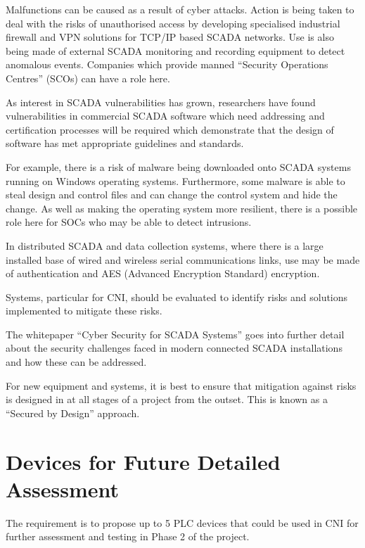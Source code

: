 Malfunctions can be caused as a result of cyber attacks. Action is being taken to deal with the risks of unauthorised access by developing specialised industrial firewall and VPN solutions for TCP/IP based SCADA networks. Use is also being made of external SCADA monitoring and recording equipment to detect anomalous events. Companies which provide manned ``Security Operations Centres''  (SCOs) can have a role here.

As interest in SCADA vulnerabilities has grown, researchers have found vulnerabilities in commercial SCADA software which need addressing and certification processes will be required which demonstrate that the design of software has met appropriate guidelines and standards.

For example, there is a risk of malware being downloaded onto SCADA systems running on Windows operating systems. Furthermore, some malware is able to steal design and control files and can change the control system and hide the change. As well as making the operating system more resilient, there is a possible role here for SOCs who may be able to detect intrusions.

In distributed SCADA and data collection systems, where there is a large installed base of wired and wireless serial communications links, use may be made of authentication and AES (Advanced Encryption Standard) encryption.

Systems, particular for CNI, should be evaluated to identify risks and solutions implemented to mitigate these risks.

The whitepaper ``Cyber Security for SCADA Systems'' \citep{pdf:thales:scadacybersec:2013q4} goes into further detail about the security challenges faced in modern connected SCADA installations and how these can be addressed.

For new equipment and systems, it is best to ensure that mitigation against risks is designed in at all stages of a project from the outset. This is known as a ``Secured by Design'' \citep{site:yt-tales:securebydesign:20160714} approach.

\pagebreak
\section{Devices for Future Detailed Assessment}
The requirement is to propose up to 5 PLC devices that could be used in CNI for further assessment and testing in Phase 2 of the project.


